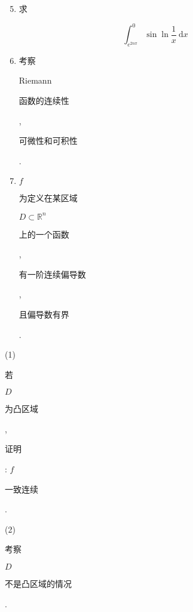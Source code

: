 \documentclass[10pt]{article}
\begin{document}
\begin{enumerate}
  \setcounter{enumi}{4}
  \item \begin{CJK}{UTF8}{mj}求\end{CJK}
\end{enumerate}
$$
\int_{e^{2 n \pi}}^{0} \sin \ln \frac{1}{x} \mathrm{~d} x
$$

\begin{enumerate}
  \setcounter{enumi}{5}
  \item \begin{CJK}{UTF8}{mj}考察\end{CJK} Riemann \begin{CJK}{UTF8}{mj}函数的连续性\end{CJK}, \begin{CJK}{UTF8}{mj}可微性和可积性\end{CJK}.

  \item $f$ \begin{CJK}{UTF8}{mj}为定义在某区域\end{CJK} $D \subset \mathbb{R}^{n}$ \begin{CJK}{UTF8}{mj}上的一个函数\end{CJK}, \begin{CJK}{UTF8}{mj}有一阶连续偏导数\end{CJK}, \begin{CJK}{UTF8}{mj}且偏导数有界\end{CJK}.

\end{enumerate}
(1) \begin{CJK}{UTF8}{mj}若\end{CJK} $D$ \begin{CJK}{UTF8}{mj}为凸区域\end{CJK}, \begin{CJK}{UTF8}{mj}证明\end{CJK}: $f$ \begin{CJK}{UTF8}{mj}一致连续\end{CJK}.

(2) \begin{CJK}{UTF8}{mj}考察\end{CJK} $D$ \begin{CJK}{UTF8}{mj}不是凸区域的情况\end{CJK}.
\end{document}
